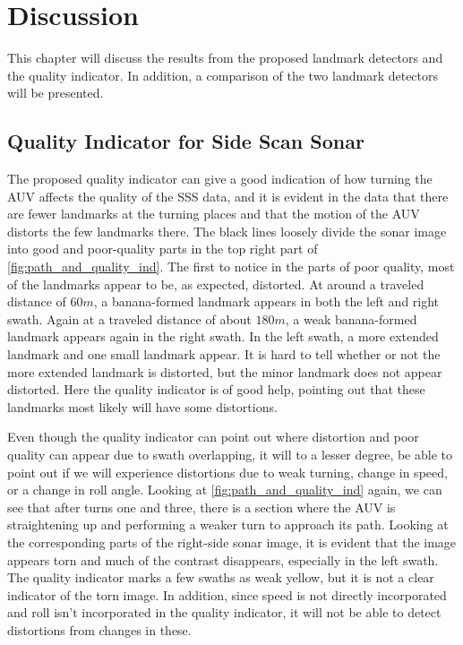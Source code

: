 \chapter{Discussion}

This chapter will discuss the results from the proposed landmark detectors and the quality indicator. In addition, a comparison of the two landmark detectors will be presented. 

\section{Quality Indicator for Side Scan Sonar}

The proposed quality indicator can give a good indication of how turning the AUV affects the quality of the SSS data, and it is evident in the data that there are fewer landmarks at the turning places and that the motion of the AUV distorts the few landmarks there. The black lines loosely divide the sonar image into good and poor-quality parts in the top right part of \cref{fig:path_and_quality_ind}. The first to notice in the parts of poor quality, most of the landmarks appear to be, as expected, distorted. At around a traveled distance of $60 m$, a banana-formed landmark appears in both the left and right swath. Again at a traveled distance of about $180 m$, a weak banana-formed landmark appears again in the right swath. In the left swath, a more extended landmark and one small landmark appear. It is hard to tell whether or not the more extended landmark is distorted, but the minor landmark does not appear distorted. Here the quality indicator is of good help, pointing out that these landmarks most likely will have some distortions. 

Even though the quality indicator can point out where distortion and poor quality can appear due to swath overlapping, it will to a lesser degree, be able to point out if we will experience distortions due to weak turning, change in speed, or a change in roll angle. Looking at \cref{fig:path_and_quality_ind} again, we can see that after turns one and three, there is a section where the AUV is straightening up and performing a weaker turn to approach its path. Looking at the corresponding parts of the right-side sonar image, it is evident that the image appears torn and much of the contrast disappears, especially in the left swath. The quality indicator marks a few swaths as weak yellow, but it is not a clear indicator of the torn image. In addition, since speed is not directly incorporated and roll isn't incorporated in the quality indicator, it will not be able to detect distortions from changes in these. 

